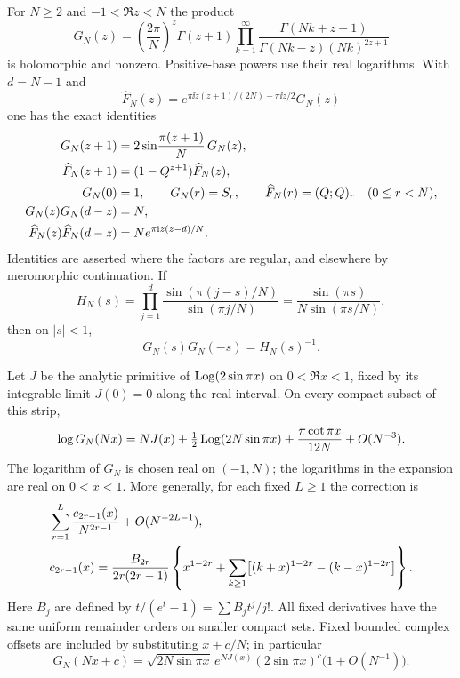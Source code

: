 \begin{lemma}\label{ca:factorial}
For $N\ge2$ and $-1<\Re z<N$ the product
\begin{equation}\label{ca:G}
 G_N(z)=\left(\frac{2\pi}{N}\right)^z\Gamma(z+1)
 \prod_{k=1}^{\infty}
 \frac{\Gamma(Nk+z+1)}{\Gamma(Nk-z)(Nk)^{2z+1}}
\end{equation}
is holomorphic and nonzero. Positive-base powers use their real logarithms. With $d=N-1$ and
\[
 \widehat F_N(z)=e^{\pi\ii z(z+1)/(2N)-\pi\ii z/2}G_N(z)
\]
one has the exact identities
\begin{align}
 G_N(z+1)&=2\sin\!\frac{\pi(z+1)}N\,G_N(z),\notag\\
 \widehat F_N(z+1)&=(1-Q^{z+1})\widehat F_N(z),\label{ca:shift}\\
 G_N(0)&=1,\qquad G_N(r)=S_r,\qquad
 \widehat F_N(r)=(Q;Q)_r\quad(0\le r<N),\notag\\
 G_N(z)G_N(d-z)&=N,\notag\\
 \widehat F_N(z)\widehat F_N(d-z)&=
 N e^{\pi\mathrm i z(z-d)/N}.\label{ca:reflection}
\end{align}
Identities are asserted where the factors are regular, and elsewhere by meromorphic continuation. If
\[
 H_N(s)=\prod_{j=1}^{d}
       \frac{\sin(\pi(j-s)/N)}{\sin(\pi j/N)}
       =\frac{\sin(\pi s)}{N\sin(\pi s/N)},
\]
then on $|s|<1$,
\begin{equation}\label{ca:small-reflection}
 G_N(s)G_N(-s)=H_N(s)^{-1}.
\end{equation}

Let $J$ be the analytic primitive of $\operatorname{Log}(2\sin\pi x)$ on
$0<\Re x<1$, fixed by its integrable limit $J(0)=0$ along the real interval. On every compact subset of this strip,
\begin{equation}\label{ca:Stirling}
 \log G_N(Nx)
 =NJ(x)+\tfrac12\operatorname{Log}(2N\sin\pi x)
       +\frac{\pi\cot\pi x}{12N}+O(N^{-3}).
\end{equation}
The logarithm of $G_N$ is chosen real on $(-1,N)$; the logarithms
in the expansion are real on $0<x<1$. More generally, for each fixed $L\ge1$ the correction is
\begin{align}
 &\sum_{r=1}^{L}\frac{c_{2r-1}(x)}{N^{2r-1}}+O(N^{-2L-1}),\notag\\
 &c_{2r-1}(x)=\frac{B_{2r}}{2r(2r-1)}
 \left\{x^{1-2r}+
 \sum_{k\ge1}\bigl[(k+x)^{1-2r}-(k-x)^{1-2r}\bigr]\right\}.
 \label{ca:all-Stirling}
\end{align}
Here $B_j$ are defined by $t/(e^t-1)=\sum B_jt^j/j!$.
All fixed derivatives have the same uniform remainder orders on smaller compact sets. Fixed bounded complex offsets are included by substituting $x+c/N$; in particular
\begin{equation}\label{ca:offset}
 G_N(Nx+c)=
 \sqrt{2N\sin\pi x}\,e^{NJ(x)}(2\sin\pi x)^c
 \bigl(1+O(N^{-1})\bigr).
\end{equation}
\end{lemma}

